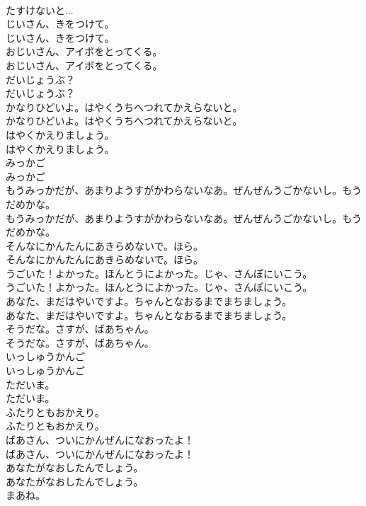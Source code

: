 \documentclass[8pt]{extreport}
\begin{document}
\begin{CJK}{UTF8}{min}
\\	たすけないと... 
\\	じいさん、きをつけて。	
\\	じいさん、きをつけて。 
\\	おじいさん、アイボをとってくる。
\\	おじいさん、アイボをとってくる。
\\	だいじょうぶ？	
\\	だいじょうぶ？ 
\\	かなりひどいよ。はやくうちへつれてかえらないと。	
\\	かなりひどいよ。はやくうちへつれてかえらないと。 
\\	はやくかえりましょう。	
\\	はやくかえりましょう。 
\\	みっかご
\\	みっかご
\\	もうみっかだが、あまりようすがかわらないなあ。ぜんぜんうごかないし。もうだめかな。	
\\	もうみっかだが、あまりようすがかわらないなあ。ぜんぜんうごかないし。もうだめかな。 
\\	そんなにかんたんにあきらめないで。ほら。	
\\	そんなにかんたんにあきらめないで。ほら。 
\\	うごいた！よかった。ほんとうによかった。じゃ、さんぽにいこう。	
\\	うごいた！よかった。ほんとうによかった。じゃ、さんぽにいこう。 
\\	あなた、まだはやいですよ。ちゃんとなおるまでまちましょう。	
\\	あなた、まだはやいですよ。ちゃんとなおるまでまちましょう。 
\\	そうだな。さすが、ばあちゃん。	
\\	そうだな。さすが、ばあちゃん。 
\\	いっしゅうかんご
\\	いっしゅうかんご
\\	ただいま。	
\\	ただいま。 
\\	ふたりともおかえり。	
\\	ふたりともおかえり。 
\\	ばあさん、ついにかんぜんになおったよ！	
\\	ばあさん、ついにかんぜんになおったよ！ 
\\	あなたがなおしたんでしょう。	
\\	あなたがなおしたんでしょう。 
\\	まあね。	

\end{CJK}
\end{document}
